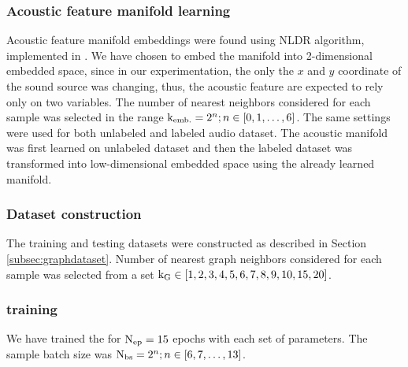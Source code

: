 \documentclass[applsci,article,submit,moreauthors,pdftex]{Definitions/mdpi}
\begin{document}
\subsubsection{Acoustic feature manifold learning}
Acoustic feature manifold embeddings were found using \isomap{} NLDR algorithm, implemented in \cite{pedregosaScikitlearnMachineLearning2011}.
We have chosen to embed the manifold into 2-dimensional embedded space, since in our experimentation, the only the $ x $ and $ y $ coordinate of the sound source was changing, thus, the acoustic feature are expected to rely only on two variables.
The number of nearest neighbors considered for each sample was selected in the range $ \mathrm{k}_{\mathrm{emb.}} = 2^n; n \in [0,1,\dots,6] $.
The same settings were used for both unlabeled and labeled audio dataset. The acoustic manifold was first learned on unlabeled dataset and then the labeled dataset was transformed into low-dimensional embedded space using the already learned manifold.


\subsubsection{Dataset construction}
The training and testing datasets were constructed as described in Section \ref{subsec:graphdataset}. Number of nearest graph neighbors considered for each sample \gnbrs{} was selected from a set $ \mathrm{k}_{\mathrm{G}}{} \in [1, 2, 3, 4, 5, 6, 7, 8, 9, 10, 15, 20] $. 



\subsubsection{\grnn{} training}
We have trained the \grnn{} for $ \mathrm{N}_{\mathrm{ep}} = 15 $ epochs with each set of parameters. The sample batch size was $ \mathrm{N}_{\mathrm{bs}} = 2^n; n \in [6,7,\dots,13] $. 


\end{document}
